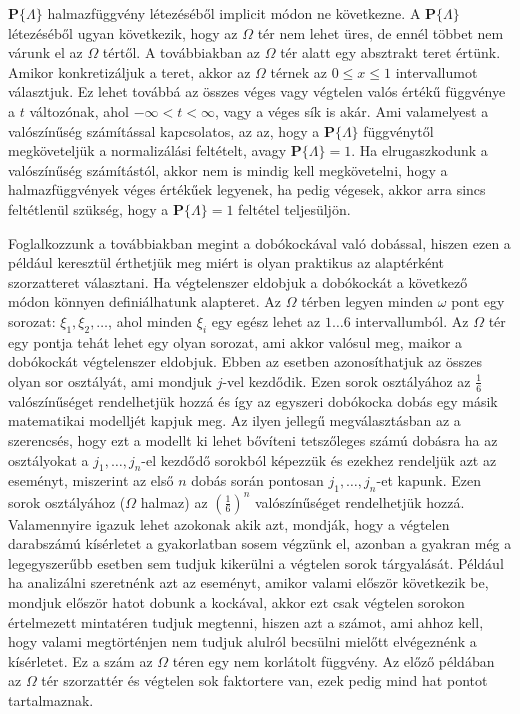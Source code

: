 \documentclass{article}
\begin{document}
$\mathbf{P}\{\Lambda\}$ halmazfüggvény létezéséből implicit módon ne következne. A $\mathbf{P}\{\Lambda\}$ létezéséből ugyan következik, hogy az $\Omega$ tér nem lehet üres, de ennél többet nem várunk el az $\Omega$ tértől. A továbbiakban az $\Omega$ tér alatt egy absztrakt teret értünk. Amikor konkretizáljuk a teret, akkor az $\Omega$ térnek az $0 \leq x \leq 1$ intervallumot választjuk. Ez lehet továbbá az összes véges vagy végtelen valós értékű függvénye a $t$ változónak, ahol $-\infty < t < \infty$, vagy a véges sík is akár. Ami valamelyest a valószínűség számítással kapcsolatos, az az, hogy a $\mathbf{P}\{\Lambda\}$ függvénytől megköveteljük a normalizálási feltételt, avagy $\mathbf{P}\{\Lambda\} = 1$. Ha elrugaszkodunk a valószínűség számítástól, akkor nem is mindig kell megkövetelni, hogy a halmazfüggvények véges értékűek legyenek, ha pedig végesek, akkor arra sincs feltétlenül szükség, hogy a $\mathbf{P}\{\Lambda\} = 1$ feltétel teljesüljön. 

Foglalkozzunk a továbbiakban megint a dobókockával való dobással, hiszen ezen a például keresztül érthetjük meg miért is olyan praktikus az alaptérként szorzatteret választani. Ha végtelenszer eldobjuk a dobókockát a következő módon könnyen definiálhatunk alapteret. Az $\Omega$ térben legyen minden $\omega$ pont egy sorozat: $\xi_1, \xi_2,\ldots$, ahol minden $\xi_i$ egy egész lehet az $1 \ldots 6$ intervallumból. Az $\Omega$ tér egy pontja tehát lehet egy olyan sorozat, ami akkor valósul meg, maikor a dobókockát végtelenszer eldobjuk. Ebben az esetben azonosíthatjuk az összes olyan sor osztályát, ami mondjuk $j$-vel kezdődik. Ezen sorok osztályához az $\frac{1}{6}$ valószínűséget rendelhetjük hozzá és így az egyszeri dobókocka dobás egy másik matematikai modelljét kapjuk meg. Az ilyen jellegű megválasztásban az a szerencsés, hogy ezt a modellt ki lehet bővíteni tetszőleges számú dobásra ha az osztályokat a $j_1,\ldots,j_n$-el kezdődő sorokból képezzük és ezekhez rendeljük azt az eseményt, miszerint az első $n$ dobás során pontosan $j_1,\ldots,j_n$-et kapunk. Ezen sorok osztályához ($\Omega$ halmaz) az $(\frac{1}{6})^{n}$ valószínűséget rendelhetjük hozzá. Valamennyire igazuk lehet azokonak akik azt, mondják, hogy a végtelen darabszámú kísérletet a gyakorlatban sosem végzünk el, azonban a gyakran még a legegyszerűbb esetben sem tudjuk kikerülni a végtelen sorok tárgyalását. Például ha analizálni szeretnénk azt az eseményt, amikor valami először következik be, mondjuk először hatot dobunk a kockával, akkor ezt csak végtelen sorokon értelmezett mintatéren tudjuk megtenni, hiszen azt a számot, ami ahhoz kell, hogy valami megtörténjen nem tudjuk alulról becsülni mielőtt elvégeznénk a kísérletet. Ez a szám az $\Omega$ téren egy nem korlátolt függvény. Az előző példában az $\Omega$ tér szorzattér és végtelen sok faktortere van, ezek pedig mind hat pontot tartalmaznak. 
\end{document}
